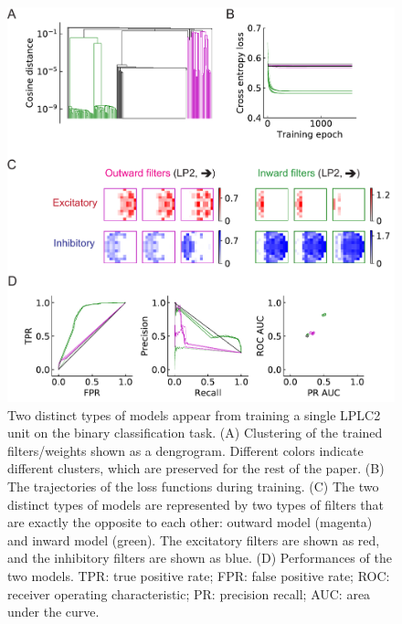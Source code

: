 \documentclass[9pt,lineno]{elife}
\begin{document}
\begin{figure}
\label{fig:model}
\end{figure}

\begin{figure}
\includegraphics[width=\linewidth]{figures/trained_results_Q1_paper.pdf}
\caption{Two distinct types of models appear from training a single LPLC2 unit on the binary classification task. (A) Clustering of the trained filters/weights shown as a dengrogram. Different colors indicate different clusters, which are preserved for the rest of the paper. (B) The trajectories of the loss functions during training. (C) The two distinct types of models are represented by two types of filters that are exactly the opposite to each other: outward model (magenta) and inward model (green). The excitatory filters are shown as red, and the inhibitory filters are shown as blue. (D) Performances of the two models. TPR: true positive rate; FPR: false positive rate; ROC: receiver operating characteristic; PR: precision recall; AUC: area under the curve.}

\end{figure}
\end{document}
